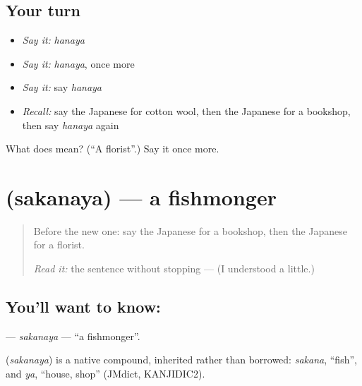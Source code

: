 \subsection*{Your turn}
\begin{itemize}
\raggedright
  \item \emph{Say it:} \emph{hanaya}
  \item \emph{Say it:} \emph{hanaya}, once more
  \item \emph{Say it:} say \emph{hanaya}
  \item \emph{Recall:} say the Japanese for cotton wool, then the Japanese for a bookshop, then say \emph{hanaya} again
\end{itemize}

\begin{tcolorbox}[breakable,colback=teal!4,colframe=teal!35!black,title={Before you move on}]
What does  mean? (\textquotedblleft{}A florist\textquotedblright{}.) Say it once more.
\end{tcolorbox}
\section[\texorpdfstring{\ja{さかなや} (sakanaya)}{さかなや (sakanaya)}]{ (sakanaya) — a fishmonger}

\label{lesson:JA-C119-sakanaya}



\begin{quote}
Before the new one: say the Japanese for a bookshop, then the Japanese for a florist.

\emph{Read it:} the sentence without stopping — \textbf{ } (I understood a little.)
\end{quote}

\subsection*{You'll want to know: }
\textbf{} — \emph{sakanaya} — \textquotedblleft{}a fishmonger\textquotedblright{}.

\begin{cousinweb}
\textbf{} (\emph{sakanaya}) is a native compound, inherited rather than borrowed: \emph{sakana}, \textquotedblleft{}fish\textquotedblright{}, and \emph{ya}, \textquotedblleft{}house, shop\textquotedblright{} (JMdict, KANJIDIC2).
\end{cousinweb}

